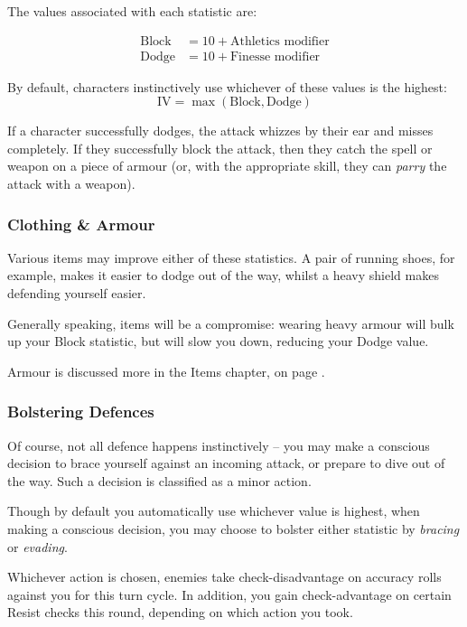 The values associated with each statistic are:

\begin{align*} 
\text{Block} &= 10 + \text{Athletics modifier} 
\\
\text{Dodge} &= 10 + \text{Finesse modifier} 
\end{align*}

By default, characters instinctively use whichever of these values is the highest:
$$ \text{IV} = \max \left( \text{Block}, \text{Dodge} \right)$$

If a character successfully dodges, the attack whizzes by their ear and misses completely. If they successfully block the attack, then they catch the spell or weapon on a piece of armour (or, with the appropriate skill, they can {\it parry} the attack with a weapon). 

\subsubsection{Clothing \& Armour}

Various items may improve either of these statistics. A pair of running shoes, for example, makes it easier to dodge out of the way, whilst a heavy shield makes defending yourself easier. 

Generally speaking, items will be a compromise: wearing heavy armour will bulk up your Block statistic, but will slow you down, reducing your Dodge value. 

Armour is discussed more in the Items chapter, on page \pageref{S:Armour}.

\subsubsection{Bolstering Defences }

Of course, not all defence happens instinctively -- you may make a conscious decision to brace yourself against an incoming attack, or prepare to dive out of the way. Such a decision is classified as a minor action. 

Though by default you automatically use whichever value is highest, when making a conscious decision, you may choose to bolster either statistic by {\it bracing} or {\it evading}. 

Whichever action is chosen, enemies take check-disadvantage on accuracy rolls against you for this turn cycle. In addition, you gain check-advantage on certain Resist checks this round, depending on which action you took. 

